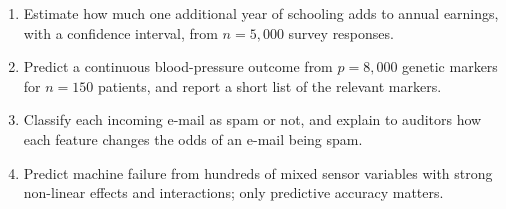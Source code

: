 \documentclass[11pt,a4paper]{article}
\begin{document}
\begin{enumerate}[label=(\alph*),leftmargin=7mm,itemsep=2.5mm]
    \begin{enumerate}[label=(\roman*),nosep,topsep=1mm]
      \item Estimate how much one additional year of schooling adds to annual earnings, with a
        confidence interval, from $n=5{,}000$ survey responses.
      \item Predict a continuous blood-pressure outcome from $p=8{,}000$ genetic markers for
        $n=150$ patients, and report a short list of the relevant markers.
      \item Classify each incoming e-mail as spam or not, and explain to auditors how each
        feature changes the odds of an e-mail being spam.
      \item Predict machine failure from hundreds of mixed sensor variables with strong
        non-linear effects and interactions; only predictive accuracy matters.
    \end{enumerate}
\end{enumerate}
\end{document}
